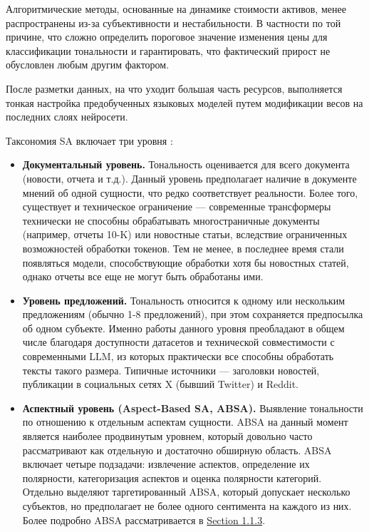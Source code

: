 Алгоритмические методы, основанные на динамике стоимости активов, менее распространены из-за
субъективности и нестабильности. В частности по той причине, что сложно определить пороговое
значение изменения цены для классификации тональности и гарантировать, что фактический прирост
не обусловлен любым другим фактором.

После разметки данных, на что уходит большая часть ресурсов, выполняется тонкая настройка
предобученных языковых моделей путем модификации весов на последних слоях нейросети.

Таксономия SA включает три уровня \parencite{SA2020taxonomy}:

\begin{itemize}
    \item \textbf{Документальный уровень.} Тональность оценивается для всего документа (новости, отчета и т.д.).
    Данный уровень предполагает наличие в документе мнений об одной сущности, что редко соответствует реальности.
    Более того, существует и техническое ограничение --- современные трансформеры технически не способны
    обрабатывать многостраничные документы (например, отчеты 10-K) или новостные статьи, вследствие ограниченных
    возможностей обработки токенов. Тем не менее, в последнее время стали появляться модели, способствующие обработки
    хотя бы новостных статей, однако отчеты все еще не могут быть обработаны ими.
    \item \textbf{Уровень предложений.} Тональность относится к одному или нескольким предложениям (обычно 1-8 предложений),
    при этом сохраняется предпосылка об одном субъекте. Именно работы данного уровня преобладают в общем числе благодаря
    доступности датасетов и технической совместимости с современными LLM, из которых практически все способны обработать
    тексты такого размера. Типичные источники --- заголовки новостей, публикации в социальных сетях X (бывший Twitter) и Reddit.
    \item \textbf{Аспектный уровень (Aspect-Based SA, ABSA).} Выявление тональности по отношению к отдельным аспектам сущности.
    ABSA на данный момент является наиболее  продвинутым уровнем, который довольно часто рассматривают как отдельную и достаточно
    обширную область. ABSA включает четыре подзадачи: извлечение аспектов, определение их полярности, категоризация аспектов
    и оценка полярности категорий. Отдельно выделяют таргетированный ABSA, который допускает несколько субъектов, но предполагает
    не более одного сентимента на каждого из них. Более подробно ABSA рассматривается в \hyperref[sec:absa]{Section 1.1.3}.
\end{itemize}

